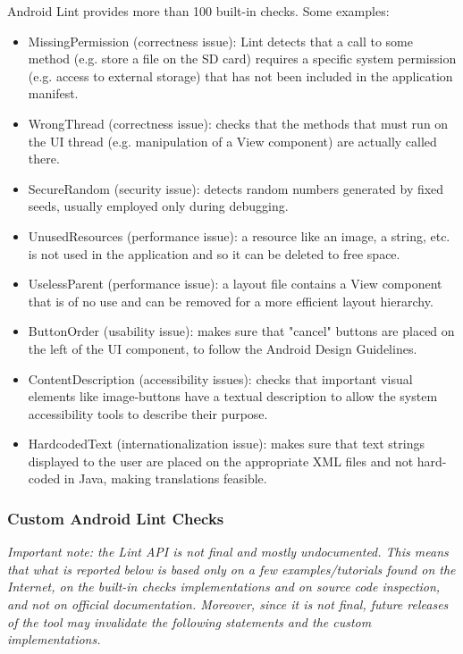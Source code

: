 \documentclass[11pt,a4paper,notitlepage]{article}
\begin{document}
Android Lint provides more than 100 built-in checks. Some examples:
\begin{itemize}
	\item MissingPermission (correctness issue): Lint detects that a call to some method (e.g. store a file on the SD card) requires a specific system permission (e.g. access to external storage) that has not been included in the application manifest.
	\item WrongThread (correctness issue): checks that the methods that must run on the UI thread (e.g. manipulation of a View component) are actually called there.
	\item SecureRandom (security issue): detects random numbers generated by fixed seeds, usually employed only during debugging.
	\item UnusedResources (performance issue): a resource like an image, a string, etc. is not used in the application and so it can be deleted to free space.
	\item UselessParent (performance issue): a layout file contains a View component that is of no use and can be removed for a more efficient layout hierarchy.
	\item ButtonOrder (usability issue): makes sure that "cancel" buttons are placed on the left of the UI component, to follow the Android Design Guidelines.
	\item ContentDescription (accessibility issues): checks that important visual elements like image-buttons have a textual description to allow the system accessibility tools to describe their purpose.
	\item HardcodedText (internationalization issue): makes sure that text strings displayed to the user are placed on the appropriate XML files and not hard-coded in Java, making translations feasible.
\end{itemize}

\subsubsection{Custom Android Lint Checks}
\textit{Important note: the Lint API is not final and mostly undocumented. This means that what is reported below is based only on a few examples/tutorials found on the Internet, on the built-in checks implementations and on source code inspection, and not on official documentation. Moreover, since it is not final, future releases of the tool may invalidate the following statements and the custom implementations.}
\end{document}
